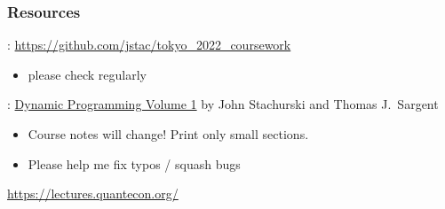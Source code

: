 \begin{frame}
    \frametitle{Resources}

    : \url{https://github.com/jstac/tokyo_2022_coursework}

    \begin{itemize}
        \item please check regularly
    \end{itemize}

    \vspace{0.3em}
    \vspace{0.3em}
    \vspace{0.3em}
    \vspace{0.3em}

    : \underline{Dynamic Programming Volume 1} 
                by John Stachurski and Thomas J.\ Sargent
    \vspace{0.3em}
    \vspace{0.3em}
    \vspace{0.3em}
    \vspace{0.3em}

    \begin{itemize}
        \item  Course notes will change! Print only small sections.
        \item Please help me fix typos / squash bugs
    \end{itemize}

    \vspace{0.3em}
    \vspace{0.3em}
    \vspace{0.3em}
    \vspace{0.3em}

     \url{https://lectures.quantecon.org/}
    
    \vspace{0.3em}
    \vspace{0.3em}
    \vspace{0.3em}
    \vspace{0.3em}


\end{frame}





